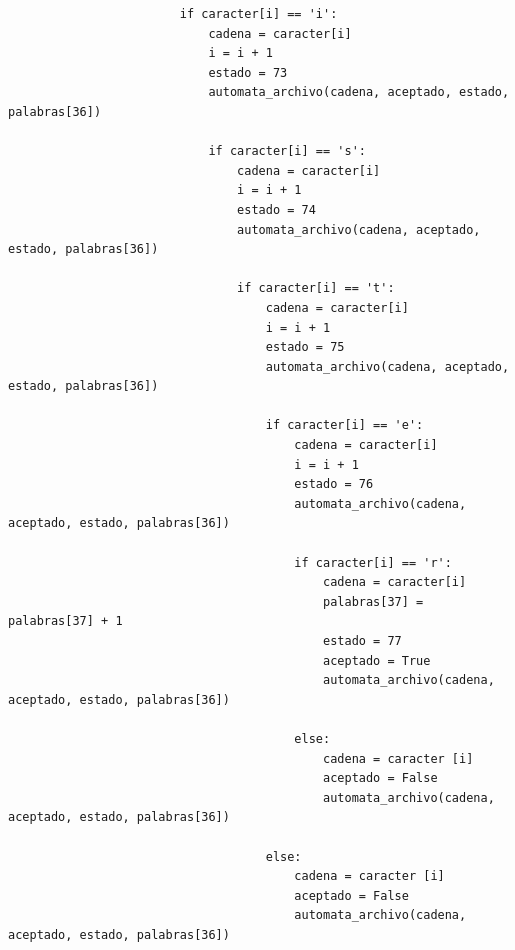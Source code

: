 \documentclass{article}
\begin{document}
\begin{flushleft}
\begin{lstlisting}
                        if caracter[i] == 'i':
                            cadena = caracter[i]
                            i = i + 1
                            estado = 73
                            automata_archivo(cadena, aceptado, estado, palabras[36])
                            
                            if caracter[i] == 's':
                                cadena = caracter[i]
                                i = i + 1
                                estado = 74
                                automata_archivo(cadena, aceptado, estado, palabras[36])
                                
                                if caracter[i] == 't':
                                    cadena = caracter[i]
                                    i = i + 1
                                    estado = 75
                                    automata_archivo(cadena, aceptado, estado, palabras[36])
                                    
                                    if caracter[i] == 'e':
                                        cadena = caracter[i]
                                        i = i + 1
                                        estado = 76
                                        automata_archivo(cadena, aceptado, estado, palabras[36])
                                    
                                        if caracter[i] == 'r':
                                            cadena = caracter[i]
                                            palabras[37] = palabras[37] + 1
                                            estado = 77
                                            aceptado = True
                                            automata_archivo(cadena, aceptado, estado, palabras[36])
                                            
                                        else:
                                            cadena = caracter [i]
                                            aceptado = False
                                            automata_archivo(cadena, aceptado, estado, palabras[36])
                                    
                                    else:
                                        cadena = caracter [i]
                                        aceptado = False
                                        automata_archivo(cadena, aceptado, estado, palabras[36])
                                        

\end{lstlisting}
\end{flushleft}
\end{document}
